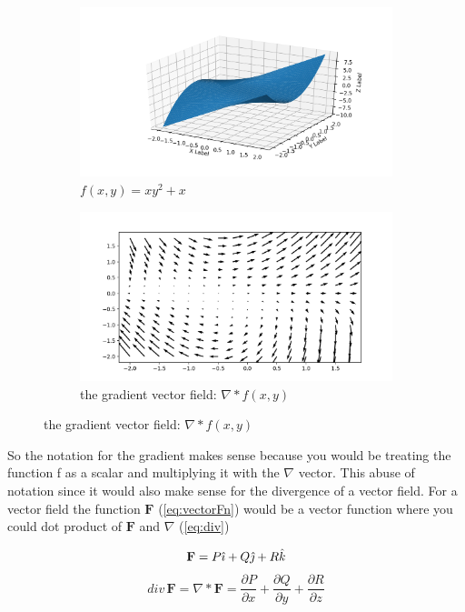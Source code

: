 \documentclass[12pt, letterpaper]{article}
\begin{document}
\begin{figure}[!h]
  \centering
  \begin{subfigure}[b]{.45\linewidth}
    \includegraphics[width=\linewidth]{Basics/multifn}
    \caption{$f(x,y) = xy^2 + x$}
  \end{subfigure}
  \begin{subfigure}[b]{.5\linewidth}
    \includegraphics[width=\linewidth]{Basics/gradient}
    \caption{the gradient vector field: $\nabla * f(x,y)$}
  \end{subfigure}
\end{figure}

So the notation for the gradient makes sense because you would be treating the function f as a scalar and
multiplying it with the $\nabla$ vector. This abuse of notation since it would also make sense for the
divergence of a vector field. For a vector field the function $\mathbf{F}$ (\ref{eq:vectorFn}) would be 
a vector function where you could dot product of $\mathbf{F}$ and $\nabla$ (\ref{eq:div})

\begin{equation}
  \mathbf{F} = P\hat{\imath} + Q\hat{\jmath} + R\hat{k} \\
  \label{eq:vectorFn}
\end{equation}
\begin{equation}
  div \, \mathbf{F} = \nabla * \mathbf{F} = \frac{\partial P}{\partial x} + \frac{\partial Q}{\partial y} +
 \frac{\partial R}{\partial z}
  \label{eq:div}
\end{equation}
\end{document}
